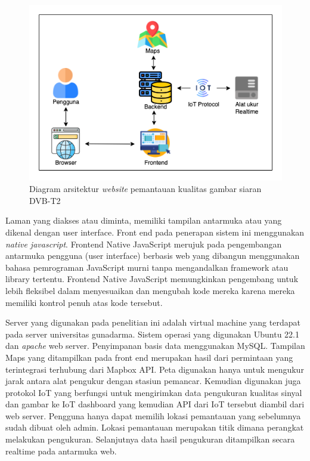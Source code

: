 \begin{figure}[H]
	\vspace{-0.1cm}
	\begin{center}
		\includegraphics[width=0.8\columnwidth]{bab3/Gambar/web-arsitektur.png}
	\end{center}
	\vspace{-0.2cm}
	\caption{Diagram arsitektur \textit{website} pemantauan kualitas gambar siaran DVB-T2}
	\label{web-arsitektur}
\end{figure}

Laman yang diakses atau diminta, memiliki tampilan antarmuka atau yang dikenal dengan user interface. Front end pada penerapan sistem ini menggunakan \textit{native javascript}. Frontend Native JavaScript merujuk pada pengembangan antarmuka pengguna (user interface) berbasis web yang dibangun menggunakan bahasa pemrograman JavaScript murni tanpa mengandalkan framework atau library tertentu. Frontend Native JavaScript memungkinkan pengembang untuk lebih fleksibel dalam menyesuaikan dan mengubah kode mereka karena mereka memiliki kontrol penuh atas kode tersebut. 

Server yang digunakan pada penelitian ini adalah virtual machine yang terdapat pada server universitas gunadarma. Sistem operasi yang digunakan Ubuntu 22.1 dan \textit{apache} web server. Penyimpanan basis data menggunakan MySQL.  Tampilan Maps yang ditampilkan pada front end merupakan hasil dari permintaan yang terintegrasi terhubung dari Mapbox API. Peta digunakan hanya untuk mengukur jarak antara alat pengukur dengan stasiun pemancar. Kemudian digunakan juga protokol IoT yang berfungsi untuk mengirimkan data pengukuran kualitas sinyal dan gambar ke IoT dashboard yang kemudian API dari IoT tersebut diambil dari web server. Pengguna hanya dapat memilih lokasi pemantauan yang sebelumnya sudah dibuat oleh admin. Lokasi pemantauan merupakan titik dimana perangkat melakukan pengukuran. Selanjutnya data hasil pengukuran ditampilkan secara realtime pada antarmuka web.



